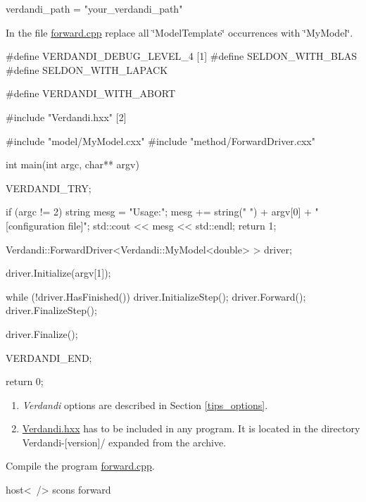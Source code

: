 \documentclass{tufte-book}
\begin{document}
\begin{DoxyItemize}
 \begin{frame_python}
verdandi_path = "your_verdandi_path"
\end{frame_python}



\item \-In the file {\ttfamily \hyperlink{forward_8cpp_source}{forward.\-cpp}} replace all \char`\"{}\-Model\-Template\char`\"{} occurrences with \char`\"{}\-My\-Model\char`\"{}.


\begin{frame_cpp}
#define VERDANDI_DEBUG_LEVEL_4 [1]
#define SELDON_WITH_BLAS
#define SELDON_WITH_LAPACK

#define VERDANDI_WITH_ABORT

#include "Verdandi.hxx" [2]

#include "model/MyModel.cxx"
#include "method/ForwardDriver.cxx"


int main(int argc, char** argv)
{
    VERDANDI_TRY;

    if (argc != 2)
    {
        string mesg  = "Usage:\n";
        mesg += string("  ") + argv[0] + " [configuration file]";
        std::cout << mesg << std::endl;
        return 1;
    }

    Verdandi::ForwardDriver<Verdandi::MyModel<double> >
        driver;

    driver.Initialize(argv[1]);

    while (!driver.HasFinished())
    {
        driver.InitializeStep();
        driver.Forward();
        driver.FinalizeStep();
    }

    driver.Finalize();

    VERDANDI_END;

    return 0;
}
\end{frame_cpp}

\begin{enumerate}
\item \emph{Verdandi} options are described in Section \ref{tips_options}.
\item {\ttfamily \hyperlink{_verdandi_8hxx_source}{\-Verdandi.\-hxx}} has to be included in any program. It is located in the directory {\ttfamily \-Verdandi-\/\mbox{[}version\mbox{]}/} expanded from the archive.
\end{enumerate}



\item \-Compile the program \hyperlink{forward_8cpp_source}{forward.\-cpp}.

\begin{frame_bash}
host<~/> scons forward
\end{frame_bash}



\end{DoxyItemize}
\end{document}
